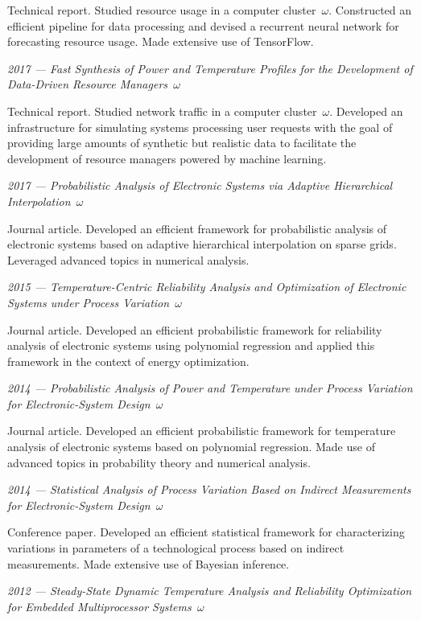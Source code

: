 \documentclass[journal]{IEEEtran}
\begin{document}
Technical report. Studied resource usage in a computer cluster~$\omega$.
Constructed an efficient pipeline for data processing and devised a recurrent
neural network for forecasting resource usage. Made extensive use of TensorFlow.

\emph{2017 --- Fast Synthesis of Power and Temperature Profiles for the
Development of Data-Driven Resource Managers~$\omega$}

Technical report. Studied network traffic in a computer cluster~$\omega$.
Developed an infrastructure for simulating systems processing user requests with
the goal of providing large amounts of synthetic but realistic data to
facilitate the development of resource managers powered by machine learning.

\emph{2017 --- Probabilistic Analysis of Electronic Systems via Adaptive
Hierarchical Interpolation~$\omega$}

Journal article. Developed an efficient framework for probabilistic analysis of
electronic systems based on adaptive hierarchical interpolation on sparse grids.
Leveraged advanced topics in numerical analysis.

\emph{2015 --- Temperature-Centric Reliability Analysis and Optimization of
Electronic Systems under Process Variation~$\omega$}

Journal article. Developed an efficient probabilistic framework for reliability
analysis of electronic systems using polynomial regression and applied this
framework in the context of energy optimization.

\emph{2014 --- Probabilistic Analysis of Power and Temperature under Process
Variation for Electronic-System Design~$\omega$}

Journal article. Developed an efficient probabilistic framework for temperature
analysis of electronic systems based on polynomial regression. Made use of
advanced topics in probability theory and numerical analysis.

\emph{2014 --- Statistical Analysis of Process Variation Based on Indirect
Measurements for Electronic-System Design~$\omega$}

Conference paper. Developed an efficient statistical framework for
characterizing variations in parameters of a technological process based on
indirect measurements. Made extensive use of Bayesian inference.

\emph{2012 --- Steady-State Dynamic Temperature Analysis and Reliability
Optimization for Embedded Multiprocessor Systems~$\omega$}
\end{document}
